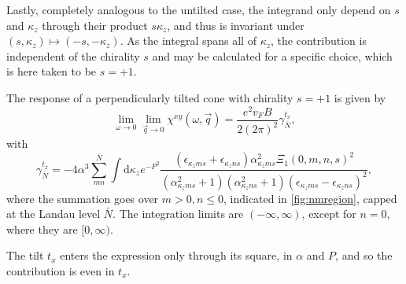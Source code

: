 Lastly, completely analogous to the untilted case, the integrand only depend on \( s \) and \( \kappa_z \) through their product \( s \kappa_z \), and thus is invariant under \( (s, \kappa_z) \mapsto (-s, -\kappa_z) \).
As the integral spans all of \( \kappa_z \), the contribution is independent of the chirality \( s \) and may be calculated for a specific choice, which is here taken to be \( s=+1 \).

\begin{summary}
  The response of a perpendicularly tilted cone with chirality \( s=+1 \) is given by
  \begin{equation}
    \label{eq:118}
    \lim_{\omega \to 0} \lim_{\vec{q} \to 0} \chi^{xy}(\omega, \vec{q}) =
    \frac{e^2v_F B }{2 (2 \pi)^2 }
    \gamma^{t_x}_{\bar{N}},
  \end{equation}
  with
  \begin{equation}
    \label{eq:119}
    \gamma^{t_x}_{\bar{N}} =
    -4 \alpha^3
    \sum\limits_{mn}^{{\bar{N}}}
    \int \mathrm{d}\kappa_z
    e^{-P^2}
    \frac{
      (\epsilon_{\kappa_z m s} + \epsilon_{\kappa_z n s})
      \alpha_{\kappa_z m s}^2 \Xi_1(0, m,n, s)^2
    }{
      (\alpha_{\kappa_z m s}^2 + 1)(\alpha_{\kappa_z n s}^2 + 1)
      (\epsilon_{\kappa_z m s} - \epsilon_{\kappa_z ns})^2
    },
  \end{equation}
  where the summation goes over \( m > 0, n \leq 0 \), indicated in \cref{fig:nmregion}, capped at the Landau level \( \bar{N} \).
  The integration limits are \( (-\infty, \infty) \), except for \( n = 0 \), where they are \( [0, \infty) \).

  The tilt \( t_x \) enters the expression only through its square, in \( \alpha \) and \( P \), and so the contribution is even in \( t_x \).
\end{summary}


